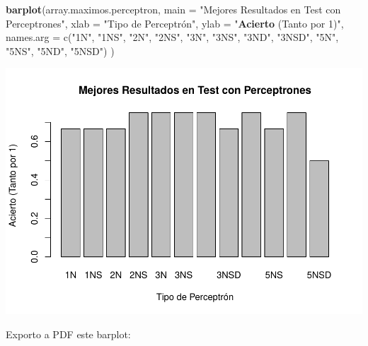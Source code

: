 \documentclass[]{article}
\newenvironment{Shaded}{\begin{snugshade}}{\end{snugshade}}
\newcommand{\DataTypeTok}[1]{\textcolor[rgb]{0.13,0.29,0.53}{#1}}
\newcommand{\DecValTok}[1]{\textcolor[rgb]{0.00,0.00,0.81}{#1}}
\newcommand{\KeywordTok}[1]{\textcolor[rgb]{0.13,0.29,0.53}{\textbf{#1}}}
\newcommand{\NormalTok}[1]{#1}
\newcommand{\StringTok}[1]{\textcolor[rgb]{0.31,0.60,0.02}{#1}}
\begin{document}
\begin{Shaded}
\begin{Highlighting}[]
\KeywordTok{barplot}\NormalTok{(array.maximos.perceptron,}
        \DataTypeTok{main =} \StringTok{"Mejores Resultados en Test con Perceptrones"}\NormalTok{,}
        \DataTypeTok{xlab =} \StringTok{"Tipo de Perceptrón",}
\StringTok{        ylab = "}\KeywordTok{Acierto}\NormalTok{ (Tanto por }\DecValTok{1}\NormalTok{)}\StringTok{",}
\StringTok{        names.arg = c("}\NormalTok{1N}\StringTok{", "}\NormalTok{1NS}\StringTok{", }
\StringTok{                      "}\NormalTok{2N}\StringTok{", "}\NormalTok{2NS}\StringTok{", }
\StringTok{                      "}\NormalTok{3N}\StringTok{", "}\NormalTok{3NS}\StringTok{", "}\NormalTok{3ND}\StringTok{", "}\NormalTok{3NSD}\StringTok{", }
\StringTok{                      "}\NormalTok{5N}\StringTok{", "}\NormalTok{5NS}\StringTok{", "}\NormalTok{5ND}\StringTok{", "}\NormalTok{5NSD}\StringTok{")}
\StringTok{      )}
\end{Highlighting}
\end{Shaded}

\includegraphics{codigo_files/figure-latex/analisis_resultados_perceptron-1.pdf}

Exporto a PDF este barplot:
\end{document}
